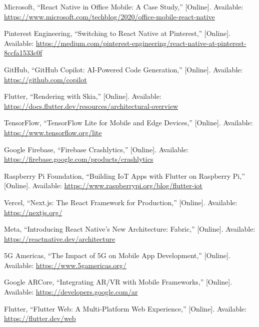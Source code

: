 \documentclass[12pt]{report}
\begin{document}
\begin{thebibliography}{1}
  Microsoft, “React Native in Office Mobile: A Case Study,” [Online]. Available: \url{https://www.microsoft.com/techblog/2020/office-mobile-react-native}

  Pinterest Engineering, “Switching to React Native at Pinterest,” [Online]. Available: \url{https://medium.com/pinterest-engineering/react-native-at-pinterest-8ccfa1533c0f}

  GitHub, “GitHub Copilot: AI-Powered Code Generation,” [Online]. Available: \url{https://github.com/copilot}

  Flutter, “Rendering with Skia,” [Online]. Available: \url{https://docs.flutter.dev/resources/architectural-overview}

  TensorFlow, “TensorFlow Lite for Mobile and Edge Devices,” [Online]. Available: \url{https://www.tensorflow.org/lite}

  Google Firebase, “Firebase Crashlytics,” [Online]. Available: \url{https://firebase.google.com/products/crashlytics}

  Raspberry Pi Foundation, “Building IoT Apps with Flutter on Raspberry Pi,” [Online]. Available: \url{https://www.raspberrypi.org/blog/flutter-iot}

  Vercel, “Next.js: The React Framework for Production,” [Online]. Available: \url{https://nextjs.org/}

  Meta, “Introducing React Native’s New Architecture: Fabric,” [Online]. Available: \url{https://reactnative.dev/architecture}

  5G Americas, “The Impact of 5G on Mobile App Development,” [Online]. Available: \url{https://www.5gamericas.org/}

  Google ARCore, “Integrating AR/VR with Mobile Frameworks,” [Online]. Available: \url{https://developers.google.com/ar}

  Flutter, “Flutter Web: A Multi-Platform Web Experience,” [Online]. Available: \url{https://flutter.dev/web}

  
    
    
\end{thebibliography}
\end{document}
